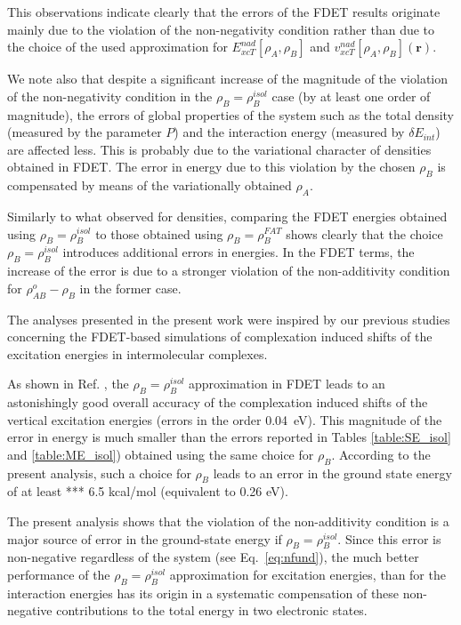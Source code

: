 \documentclass[amsmath,amssymb,preprint,aip,jcp]{revtex4-1}
\begin{document}
This observations indicate clearly that the errors of the FDET results originate mainly due to the violation of the non-negativity condition rather than due to the choice of the used approximation for ${E}_{xcT}^{nad}[\rho_A,\rho_B]$ and ${v}_{xcT}^{nad}[\rho_A,\rho_B](\mathbf{r})$.

We note also that despite a significant increase of the magnitude of the violation of the non-negativity condition in the $\rho_B=\rho_B^{isol}$ case (by at least one order of magnitude), the errors of global properties of the system such as the total density (measured by the parameter $P$) and the interaction energy (measured by $\delta E_{int}$) are affected less. This is probably due to the variational character of densities obtained in FDET. The error in energy due to this violation by the chosen $\rho_B$ is compensated by means of the variationally obtained $\rho_A$.

Similarly to what observed for densities, comparing the FDET energies obtained using $\rho_B=\rho_B^{isol}$ to those obtained using $\rho_B=\rho_B^{FAT}$ shows clearly that the choice $\rho_B=\rho_B^{isol}$ introduces additional errors in energies. In the FDET terms, the increase of the error is due to a stronger violation of the non-additivity condition for $\rho^{o}_{AB}-\rho_B$ in the former case.

The analyses presented in the present work were inspired by our previous studies concerning the FDET-based simulations of complexation induced shifts of the excitation energies in intermolecular complexes.

As shown in Ref. , the $\rho_B=\rho_B^{isol}$ approximation in FDET leads to an astonishingly good overall accuracy of the complexation induced shifts of the vertical excitation energies (errors in the order 0.04~eV). This magnitude of the error in energy is much smaller than the errors reported in Tables \ref{table:SE_isol} and \ref{table:ME_isol}) obtained using the same choice for $\rho_B$. 
According to the present analysis, such a choice for 
$\rho_B$ leads to an error in the ground state energy of at least *** 6.5 kcal/mol (equivalent to 0.26 eV).

The present analysis shows that the violation of the non-additivity condition is a major source of error in the ground-state energy if $\rho_B=\rho_B^{isol}$. Since this error is non-negative regardless of the system (see Eq.~\ref{eq:nfund}),
the much better performance of the $\rho_B=\rho_B^{isol}$ approximation for excitation energies\cite{Ricardi2018}, than for the interaction energies has its origin in a systematic compensation of these non-negative contributions to the total energy in two electronic states. 
\end{document}
